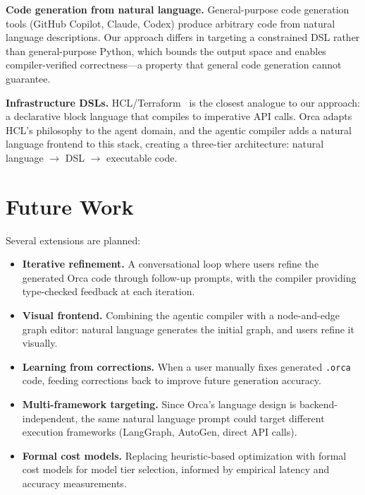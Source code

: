 \documentclass[sigconf,nonacm]{acmart}
\begin{document}
\noindent\textbf{Code generation from natural language.}
General-purpose code generation tools (GitHub Copilot, Claude, Codex)
produce arbitrary code from natural language descriptions. Our approach
differs in targeting a constrained DSL rather than general-purpose
Python, which bounds the output space and enables compiler-verified
correctness---a property that general code generation cannot guarantee.

\noindent\textbf{Infrastructure DSLs.}
HCL/Terraform~\cite{terraform} is the closest analogue to our approach:
a declarative block language that compiles to imperative API calls. Orca
adapts HCL's philosophy to the agent domain, and the agentic compiler
adds a natural language frontend to this stack, creating a three-tier
architecture: natural language $\rightarrow$ DSL $\rightarrow$
executable code.

\section{Future Work}
\label{sec:future}

Several extensions are planned:

\begin{itemize}[leftmargin=*]
  \item \textbf{Iterative refinement.} A conversational loop where
        users refine the generated Orca code through follow-up prompts,
        with the compiler providing type-checked feedback at each
        iteration.
  \item \textbf{Visual frontend.} Combining the agentic compiler with a
        node-and-edge graph editor: natural language generates the
        initial graph, and users refine it visually.
  \item \textbf{Learning from corrections.} When a user manually fixes
        generated \texttt{.orca} code, feeding corrections back to
        improve future generation accuracy.
  \item \textbf{Multi-framework targeting.} Since Orca's language
        design is backend-independent, the same natural language prompt
        could target different execution frameworks (LangGraph, AutoGen,
        direct API calls).
  \item \textbf{Formal cost models.} Replacing heuristic-based
        optimization with formal cost models for model tier selection,
        informed by empirical latency and accuracy measurements.
\end{itemize}
\end{document}
